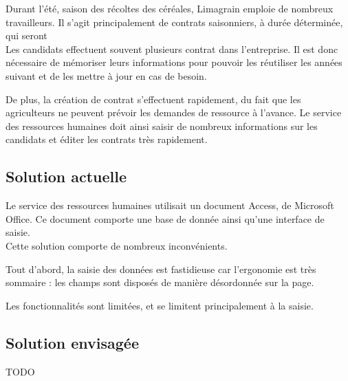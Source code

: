 Durant l'été, saison des récoltes des céréales, Limagrain emploie de nombreux travailleurs.
Il s'agit principalement de contrats saisonniers, à durée déterminée, qui seront 
\\


Les candidats effectuent souvent plusieurs contrat dans l'entreprise.
Il est donc nécessaire de mémoriser leurs informations pour pouvoir les réutiliser les années suivant et de les mettre à jour en cas de besoin.

De plus, la création de contrat s'effectuent rapidement, du fait que les agriculteurs ne peuvent prévoir les demandes de ressource à l'avance.
Le service des ressources humaines doit ainsi saisir de nombreux informations sur les candidats et éditer les contrats très rapidement.




\subsection{Solution actuelle}

Le service des ressources humaines utilisait un document Access, de Microsoft Office.
Ce document comporte une base de donnée ainsi qu'une interface de saisie.
\\


Cette solution comporte de nombreux inconvénients.

Tout d'abord, la saisie des données est fastidieuse car l'ergonomie est très sommaire : les champs sont disposés de manière désordonnée sur la page.

Les fonctionnalités sont limitées, et se limitent principalement à la saisie.




\subsection{Solution envisagée}

TODO